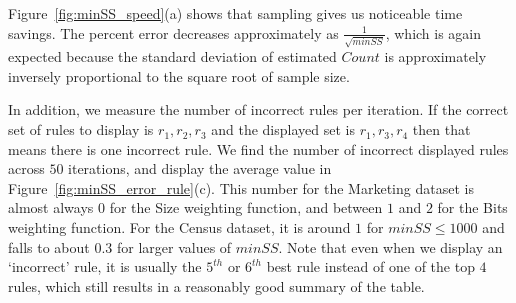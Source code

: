 \documentclass[10pt,journal,compsoc]{IEEEtran}
\begin{document}
Figure~\ref{fig:minSS_speed}(a) shows that sampling gives us noticeable time savings. The percent error decreases approximately as $\frac{1}{\sqrt{minSS}}$, which is again expected because the standard deviation of estimated $Count$ is approximately inversely proportional to the square root of sample size.

In addition, we measure the number of incorrect rules per iteration. If the correct set of rules to display is $r_1, r_2, r_3$ and the displayed set is $r_1, r_3, r_4$ then that means there is one incorrect rule. We find the number of incorrect displayed rules across $50$ iterations, and display the average value in Figure~\ref{fig:minSS_error_rule}(c). This number for the Marketing dataset is almost always $0$ for the Size weighting function, and between $1$ and $2$ for the Bits weighting function. For the Census dataset, it is around $1$ for $minSS \leq 1000$ and falls to about $0.3$ for larger values of $minSS$. Note that even when we display an `incorrect' rule, it is usually the $5^{th}$ or $6^{th}$ best rule instead of one of the top $4$ rules, which still results in a reasonably good summary of the table.
\end{document}
